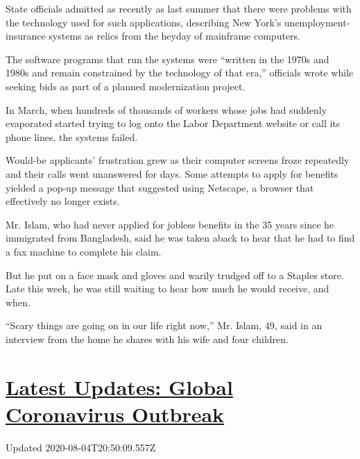 State officials admitted as recently as last summer that there were
problems with the technology used for such applications, describing New
York's unemployment-insurance systems as relics from the heyday of
mainframe computers.

The software programs that run the systems were ``written in the 1970s
and 1980s and remain constrained by the technology of that era,''
officials wrote while seeking bids as part of a planned modernization
project.

In March, when hundreds of thousands of workers whose jobs had suddenly
evaporated started trying to log onto the Labor Department website or
call its phone lines, the systems failed.

Would-be applicants' frustration grew as their computer screens froze
repeatedly and their calls went unanswered for days. Some attempts to
apply for benefits yielded a pop-up message that suggested using
Netscape, a browser that effectively no longer exists.

Mr. Islam, who had never applied for jobless benefits in the 35 years
since he immigrated from Bangladesh, said he was taken aback to hear
that he had to find a fax machine to complete his claim.

But he put on a face mask and gloves and warily trudged off to a Staples
store. Late this week, he was still waiting to hear how much he would
receive, and when.

``Scary things are going on in our life right now,'' Mr. Islam, 49, said
in an interview from the home he shares with his wife and four children.

\hypertarget{latest-updates-global-coronavirus-outbreak}{%
\section{\texorpdfstring{\href{https://www.nytimes.com/2020/08/04/world/coronavirus-cases.html?action=click\&pgtype=Article\&state=default\&region=MAIN_CONTENT_1\&context=storylines_live_updates}{Latest
Updates: Global Coronavirus
Outbreak}}{Latest Updates: Global Coronavirus Outbreak}}\label{latest-updates-global-coronavirus-outbreak}}

Updated 2020-08-04T20:50:09.557Z

